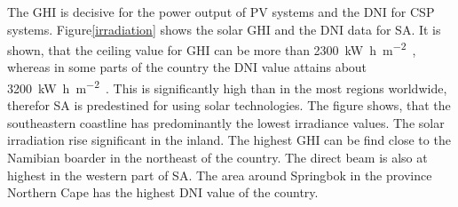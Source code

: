 The GHI is decisive for the power output of PV systems and the DNI for CSP systems. Figure\ref{irradiation} shows the solar GHI and the DNI data for SA. It is shown, that the ceiling value for GHI can be more than \SI{2300}{\kilo\watt\hour\per\square\metre\year}, whereas in some parts of the country the DNI  value attains about \SI{3200}{\kilo\watt\hour\per\square\metre\year}. This is significantly high than in the most regions worldwide, therefor SA is predestined for using solar technologies. The figure shows, that the southeastern coastline has predominantly the lowest irradiance values. The solar irradiation rise significant in the inland. The highest GHI can be find close to the Namibian boarder in the northeast of the country. The direct beam is also at highest in the western part of SA. The area around Springbok in the province Northern Cape has the highest DNI value of the country.


